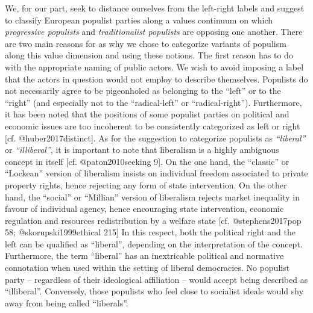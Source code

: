 \documentclass[]{article}
\begin{document}
We, for our part, seek to distance ourselves from the left-right labels
and suggest to classify European populist parties along a values
continuum on which \emph{progressive populists} and \emph{traditionalist
populists} are opposing one another. There are two main reasons for as
why we chose to categorize variants of populism along this value
dimension and using these notions. The first reason has to do with the
appropriate naming of public actors. We wish to avoid imposing a label
that the actors in question would not employ to describe themselves.
Populists do not necessarily agree to be pigeonholed as belonging to the
``left'' or to the ``right'' (and especially not to the ``radical-left''
or ``radical-right''). Furthermore, it has been noted that the positions
of some populist parties on political and economic issues are too
incoherent to be consistently categorized as left or right {[}cf.
@huber2017distinct{]}. As for the suggestion to categorize populists as
\emph{``liberal''} or \emph{``illiberal''}, it is important to note that
liberalism is a highly ambiguous concept in itself {[}cf.
@paton2010seeking 9{]}. On the one hand, the ``classic'' or ``Lockean''
version of liberalism insists on individual freedom associated to
private property rights, hence rejecting any form of state intervention.
On the other hand, the ``social'' or ``Millian'' version of liberalism
rejects market inequality in favour of individual agency, hence
encouraging state intervention, economic regulation and resources
redistribution by a welfare state {[}cf. @stephens2017pop 58;
@skorupski1999ethical 215{]} In this respect, both the political right
and the left can be qualified as ``liberal'', depending on the
interpretation of the concept. Furthermore, the term ``liberal'' has an
inextricable political and normative connotation when used within the
setting of liberal democracies. No populist party -- regardless of their
ideological affiliation -- would accept being described as
``illiberal''. Conversely, those populists who feel close to socialist
ideals would shy away from being called ``liberals''.
\end{document}

